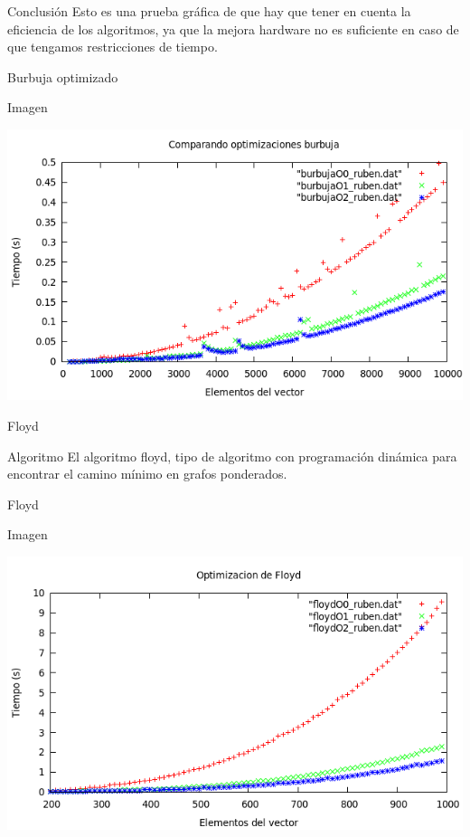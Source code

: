 \documentclass[compress]{beamer}
\begin{document}
\begin{frame}
	\begin{alertblock}{Conclusión}
	Esto es una prueba gráfica de que hay que tener en cuenta la eficiencia de los 				algoritmos, ya que la mejora hardware no es suficiente en caso de que tengamos 				restricciones de tiempo.
	\end{alertblock}
\end{frame}

\begin{frame}{Burbuja optimizado}
	\begin{alertblock}{Imagen}
	\begin{center}
	\includegraphics[scale=0.45]{../Graficas/Burbuja/burbuja_optimizacion.png}
	\end{center}
	\end{alertblock}
\end{frame}

\begin{frame}{Floyd}
	\begin{block}{Algoritmo}
	El algoritmo floyd, tipo de algoritmo con programación dinámica para encontrar el 			camino mínimo en grafos ponderados.
	\end{block}
\end{frame}

\begin{frame}{Floyd}
	\begin{alertblock}{Imagen}
	\begin{center}
	\includegraphics[scale=0.45]{../Graficas/Floyd/floyd_optimizacion.png}
	\end{center}
	\end{alertblock}
\end{frame}
\end{document}
